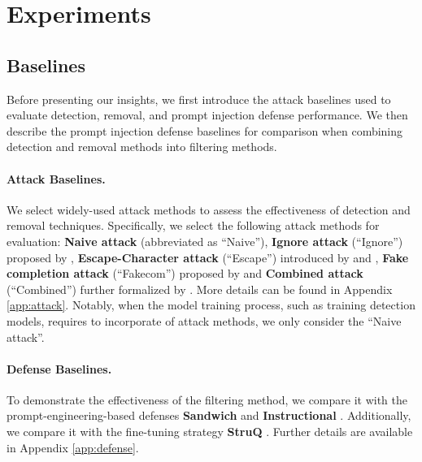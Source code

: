 

\section{Experiments}


\subsection{Baselines}

Before presenting our insights, we first introduce the attack baselines used to evaluate detection, removal, and prompt injection defense performance. We then describe the prompt injection defense baselines for comparison when combining detection and removal methods into filtering methods.

\paragraph{Attack Baselines.}
We select widely-used attack methods to assess the effectiveness of detection and removal techniques. Specifically,  we select the following  attack methods for evaluation: \textbf{Naive attack} (abbreviated as ``Naive''), \textbf{Ignore attack} (``Ignore'') proposed by \citet{perez2022ignore}, \textbf{Escape-Character attack} (``Escape'') introduced by \citet{breitenbach2023dont} and \citet{liu2024formalizing}, \textbf{Fake completion attack} (``Fakecom'') proposed by \citet{willison_2023} and \textbf{Combined attack} (``Combined'') further formalized by \cite{liu2024formalizing}. More details can be found in Appendix \ref{app:attack}. Notably, when the model training process, such as training detection models, requires to incorporate of attack methods, we only consider the ``Naive attack''.

\paragraph{Defense Baselines.}
To demonstrate the effectiveness of the filtering method, we compare it with the prompt-engineering-based defenses \textbf{Sandwich} \cite{sandwich_defense_2023} and \textbf{Instructional} \cite{instruction_defense_2023}. Additionally, we compare it with the fine-tuning strategy \textbf{StruQ} \cite{chen2024struq}. Further details are available in Appendix \ref{app:defense}.



